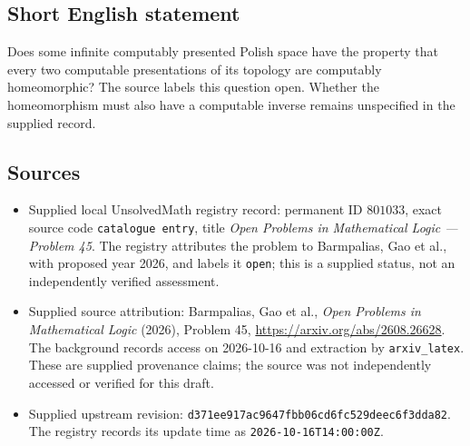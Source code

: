 \documentclass[11pt]{article}
\begin{document}
\subsection{Short English statement}
Does some infinite computably presented Polish space have the property that every two computable presentations of its topology are computably homeomorphic? The source labels this question open. Whether the homeomorphism must also have a computable inverse remains unspecified in the supplied record.
\subsection{Sources}
\begin{itemize}
\item Supplied local UnsolvedMath registry record: permanent ID \(801033\), exact source code \texttt{catalogue entry}, title \emph{Open Problems in Mathematical Logic --- Problem 45}. The registry attributes the problem to Barmpalias, Gao et al., with proposed year 2026, and labels it \texttt{open}; this is a supplied status, not an independently verified assessment.
\item Supplied source attribution: Barmpalias, Gao et al., \emph{Open Problems in Mathematical Logic} (2026), Problem 45, \url{https://arxiv.org/abs/2608.26628}. The background records access on 2026-10-16 and extraction by \texttt{arxiv\_latex}. These are supplied provenance claims; the source was not independently accessed or verified for this draft.
\item Supplied upstream revision: \texttt{d371ee917ac9647fbb06cd6fc529deec6f3dda82}. The registry records its update time as \texttt{2026-10-16T14:00:00Z}.
\end{itemize}
\end{document}
